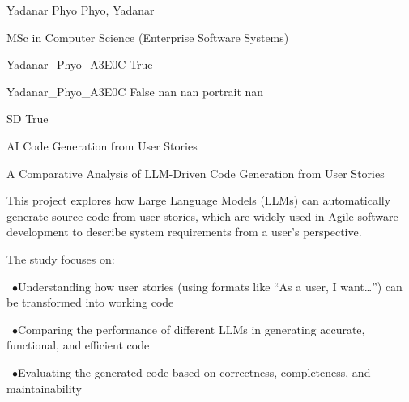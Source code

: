 
\begingroup{}\relax



\def\Key{Yadanar_Phyo_A3E0C}

{Yadanar Phyo}
{Phyo, Yadanar}

{MSc in Computer Science (Enterprise Software Systems)}

{Yadanar_Phyo_A3E0C}
{True}

{Yadanar_Phyo_A3E0C}
{False}
{nan}
{nan}
{portrait}
{nan}

{SD}
{True}

{AI Code Generation from User Stories}

{A Comparative Analysis of LLM-Driven Code Generation from User Stories}

{This project explores how Large Language Models (LLMs) can automatically generate source code from user stories, which are widely used in Agile software development to describe system requirements from a user's perspective.

The study focuses on:\par\ $\bullet$\quad Understanding how user stories (using formats like “As a user, I want…”) can be transformed into working code\par\ $\bullet$\quad Comparing the performance of different LLMs in generating accurate, functional, and efficient code\par\ $\bullet$\quad Evaluating the generated code based on correctness, completeness, and maintainability}

